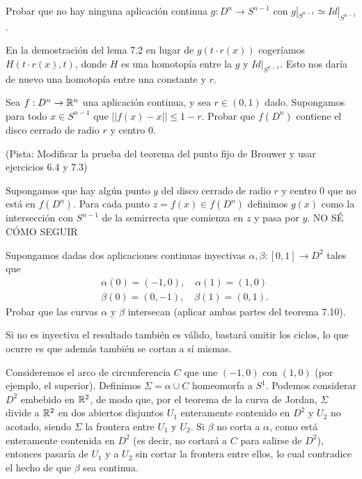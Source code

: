 \documentclass[twoside]{article}
\begin{document}
\begin{ejercicio}{7.3}
Probar que no hay ninguna aplicación continua $g:D^n\to S^{n-1}$ con $g|_{S^{n-1}}\simeq Id|_{S^{n-1}}$.
\end{ejercicio}
\begin{solucion}
En la demostración del lema 7.2 en lugar de $g(t\cdot r(x))$ cogeríamos $H(t\cdot r(x), t)$, donde $H$ es una homotopía entre la $g$ y $Id|_{S^{n-1}}$. Esto nos daría de nuevo una homotopía entre una constante y $r$.
\end{solucion}
\newpage

\begin{ejercicio}{7.4}
Sea $f:D^n\to\mathbb{R}^n$ una aplicación continua, y sea $r\in(0,1)$ dado. Supongamos para todo $x\in S^{n-1}$ que $||f(x)-x||\leq 1-r$. Probar que $f(D^n)$ contiene el disco cerrado de radio $r$ y centro 0.

(Pista: Modificar la prueba del teorema del punto fijo de Brouwer y usar ejercicios 6.4 y 7.3)
\end{ejercicio}
\begin{solucion}
Supongamos que hay algún punto $y$ del disco cerrado de radio $r$ y centro 0 que no está en $f(D^n)$. Para cada punto $z=f(x)\in f(D^n)$ definimos $g(x)$ como la intersección con $S^{n-1}$ de la semirrecta que comienza en $z$ y pasa por $y$. NO SÉ CÓMO SEGUIR
\end{solucion}

\newpage

\begin{ejercicio}{7.5}
Supongamos dadas dos aplicaciones continuas inyectivas $\alpha,\beta:[0,1]\to D^2$ tales que 
\begin{align*}
&\alpha(0)=(-1,0), \quad \alpha(1)=(1,0)\\
&\beta(0)=(0,-1), \quad \beta(1)=(0,1).
\end{align*}
Probar que las curvas $\alpha$ y $\beta$ intersecan (aplicar ambas partes del teorema 7.10). 
\end{ejercicio}
\begin{solucion}
Si no es inyectiva el resultado también es válido, bastará omitir los ciclos, lo que ocurre es que además también se cortan a sí mismas.

Consideremos el arco de circunferencia $C$ que une $(-1,0)$ con $(1,0)$ (por ejemplo, el superior). Definimos $\Sigma=\alpha\cup C$ homeomorfa a $S^1$. Podemos considerar $D^2$ embebido en $\mathbb{R}^2$, de modo que, por el teorema de la curva de Jordan, $\Sigma$ divide a $\mathbb{R}^2$ en dos abiertos disjuntos $U_1$ enteramente contenido en $D^2$ y $U_2$ no acotado, siendo $\Sigma$ la frontera entre $U_1$ y $U_2$. Si $\beta$ no corta a $\alpha$, como está enteramente contenida en $D^2$ (es decir, no cortará a $C$ para salirse de $D^2$), entonces pasaría de $U_1$ y a $U_2$ sin cortar la frontera entre ellos, lo cual contradice el hecho de que $\beta$ sea continua.
\end{solucion}
\end{document}

